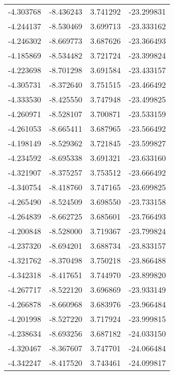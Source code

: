 \begin{tabular}{rrrr}
       -4.303768 &        -8.436243 &    3.741292 & -23.299831 \\
       -4.244137 &        -8.530469 &    3.699713 & -23.333162 \\
       -4.246302 &        -8.669773 &    3.687626 & -23.366493 \\
       -4.185869 &        -8.534482 &    3.721724 & -23.399824 \\
       -4.223698 &        -8.701298 &    3.691584 & -23.433157 \\
       -4.305731 &        -8.372640 &    3.751515 & -23.466492 \\
       -4.333530 &        -8.425550 &    3.747948 & -23.499825 \\
       -4.260971 &        -8.528107 &    3.700871 & -23.533159 \\
       -4.261053 &        -8.665411 &    3.687965 & -23.566492 \\
       -4.198149 &        -8.529362 &    3.721845 & -23.599827 \\
       -4.234592 &        -8.695338 &    3.691321 & -23.633160 \\
       -4.321907 &        -8.375257 &    3.753512 & -23.666492 \\
       -4.340754 &        -8.418760 &    3.747165 & -23.699825 \\
       -4.265490 &        -8.524509 &    3.698550 & -23.733158 \\
       -4.264839 &        -8.662725 &    3.685601 & -23.766493 \\
       -4.200848 &        -8.528000 &    3.719367 & -23.799824 \\
       -4.237320 &        -8.694201 &    3.688734 & -23.833157 \\
       -4.321762 &        -8.370498 &    3.750218 & -23.866488 \\
       -4.342318 &        -8.417651 &    3.744970 & -23.899820 \\
       -4.267717 &        -8.522120 &    3.696869 & -23.933149 \\
       -4.266878 &        -8.660968 &    3.683976 & -23.966484 \\
       -4.201998 &        -8.527220 &    3.717924 & -23.999815 \\
       -4.238634 &        -8.693256 &    3.687182 & -24.033150 \\
       -4.320467 &        -8.367607 &    3.747701 & -24.066484 \\
       -4.342247 &        -8.417520 &    3.743461 & -24.099817 \\

\end{tabular}
